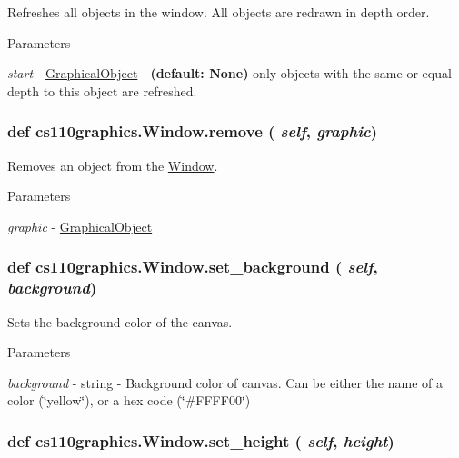 Refreshes all objects in the window. All objects are redrawn in depth order. 
\begin{DoxyParams}{Parameters}
\item[{\em start}]-\/ \hyperlink{classcs110graphics_1_1GraphicalObject}{GraphicalObject} -\/ {\bfseries (default: None)} only objects with the same or equal depth to this object are refreshed. \end{DoxyParams}
\hypertarget{classcs110graphics_1_1Window_a14aba875d32f8a70a0c5a80ac3f18a92}{
\subsubsection[{remove}]{\setlength{\rightskip}{0pt plus 5cm}def cs110graphics.Window.remove ( {\em self}, \/   {\em graphic})}}
\label{classcs110graphics_1_1Window_a14aba875d32f8a70a0c5a80ac3f18a92}


Removes an object from the \hyperlink{classcs110graphics_1_1Window}{Window}. 
\begin{DoxyParams}{Parameters}
\item[{\em graphic}]-\/ \hyperlink{classcs110graphics_1_1GraphicalObject}{GraphicalObject} \end{DoxyParams}
\hypertarget{classcs110graphics_1_1Window_a981a3115f1f22099549117313f38333c}{
\subsubsection[{set\_\-background}]{\setlength{\rightskip}{0pt plus 5cm}def cs110graphics.Window.set\_\-background ( {\em self}, \/   {\em background})}}
\label{classcs110graphics_1_1Window_a981a3115f1f22099549117313f38333c}


Sets the background color of the canvas. 
\begin{DoxyParams}{Parameters}
\item[{\em background}]-\/ string -\/ Background color of canvas. Can be either the name of a color (\char`\"{}yellow\char`\"{}), or a hex code (\char`\"{}\#FFFF00\char`\"{}) \end{DoxyParams}
\hypertarget{classcs110graphics_1_1Window_a9b548549f8f09ca3f29e6e80483e21d2}{
\subsubsection[{set\_\-height}]{\setlength{\rightskip}{0pt plus 5cm}def cs110graphics.Window.set\_\-height ( {\em self}, \/   {\em height})}}
\label{classcs110graphics_1_1Window_a9b548549f8f09ca3f29e6e80483e21d2}


